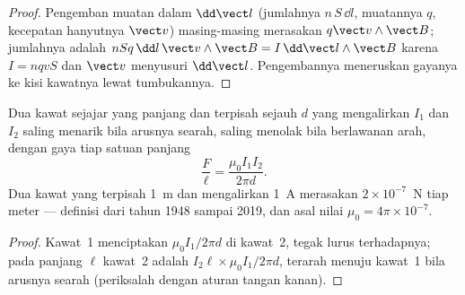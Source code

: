 \begin{proof}
Pengemban muatan dalam $\dd\vect l$ (jumlahnya $n\,S\,\dd l$, muatannya $q$,
kecepatan hanyutnya $\vect v$) masing-masing merasakan $q\vect v\wedge\vect B$; jumlahnya
adalah $nSq\,\dd l\,\vect v\wedge\vect B = I\,\dd\vect l\wedge\vect B$ karena $I = nqvS$
dan $\vect v$ menyusuri $\dd\vect l$. Pengembannya meneruskan gayanya ke
kisi kawatnya lewat tumbukannya.
\end{proof}

\begin{proposition}\label{prop:b1:magnetostatics:parallel}
Dua kawat sejajar yang panjang dan terpisah sejauh $d$ yang mengalirkan $I_1$ dan $I_2$
saling menarik bila arusnya searah, saling menolak bila berlawanan arah,
dengan gaya tiap satuan panjang
\[
\frac{F}{\ell} = \frac{\mu_0I_1I_2}{2\pi d} .
\]
Dua kawat yang terpisah \qty{1}{m} dan mengalirkan \qty{1}{A} merasakan $2 \times 10^{-7}$~N tiap
meter --- definisi  dari tahun 1948 sampai 2019, dan asal
nilai $\mu_0 = 4\pi \times 10^{-7}$.
\end{proposition}

\begin{proof}
Kawat~1 menciptakan $\mu_0I_1/2\pi d$ di kawat~2, tegak lurus terhadapnya;
 pada panjang $\ell$ kawat~2 adalah $I_2\ell \times \mu_0I_1/2\pi d$,
terarah menuju kawat~1 bila arusnya searah (periksalah dengan
aturan tangan kanan).
\end{proof}

